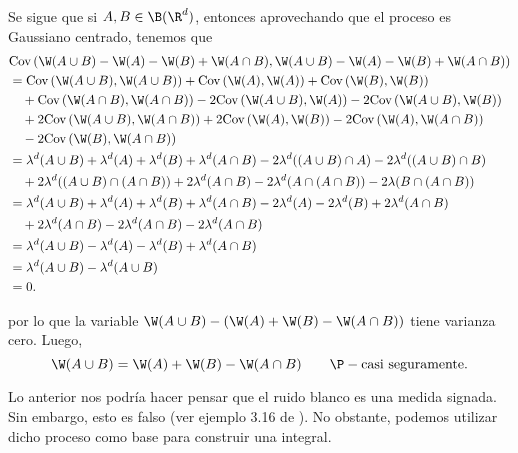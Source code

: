 \begin{ejem}
Se sigue que si $A,B\in \B(\R^d)$, entonces aprovechando que el proceso es Gaussiano centrado, tenemos que
\begin{align*}
    &\text{Cov}\left(\W(A\cup B)-\W(A)-\W(B)+\W(A\cap B),\W(A\cup B)-\W(A)-\W(B)+\W(A\cap B)\right)\\
    &=\text{Cov}\left(\W(A\cup B),\W(A\cup B)\right)+\text{Cov}\left(\W(A),\W(A)\right)+\text{Cov}\left(\W(B),\W(B)\right)\\
    &\quad +\text{Cov}\left(\W(A\cap B),\W(A\cap B)\right)-2 \text{Cov}\left(\W(A\cup B),\W(A)\right)-2 \text{Cov}\left(\W(A\cup B), \W(B)\right)\\
    &\quad +2 \text{Cov}\left(\W(A\cup B), \W(A\cap B)\right)+2 \text{Cov}\left(\W(A),\W(B)\right)-2 \text{Cov}\left(\W(A),\W(A\cap B)\right)\\
    &\quad -2 \text{Cov}\left(\W(B),\W(A\cap B)\right)\\
    &=\lambda^{d}(A\cup B)+\lambda^{d}(A)+\lambda^{d}(B)+\lambda^{d}(A\cap B)-2\lambda^{d}((A\cup B)\cap A)-2\lambda^{d}((A\cup B)\cap B)\\
    &\quad+2\lambda^{d}((A\cup B)\cap (A\cap B))+2\lambda^{d}(A\cap B)-2\lambda^{d}(A\cap (A\cap B))-2\lambda(B\cap(A\cap B))\\
    &=\lambda^{d}(A\cup B)+\lambda^d(A)+\lambda^{d}(B)+\lambda^{d}(A\cap B)-2\lambda^{d}(A)-2\lambda^{d}(B)+2\lambda^{d}(A\cap B)\\
    &\quad +2\lambda^{d}(A\cap B)-2\lambda^{d}(A\cap B)-2\lambda^{d}(A\cap B)\\
    &=\lambda^{d}(A\cup B)-\lambda^d(A)-\lambda^{d}(B)+\lambda^{d}(A\cap B)\\
    &=\lambda^{d}(A\cup B)-\lambda^{d}(A\cup B)\\
    &=0.
\end{align*}

por lo que la variable $\W(A\cup B)-(\W(A)+\W(B)-\W(A\cap B))$ tiene varianza cero. Luego,
\begin{equation}\label{Wdotmeasure}    
    \W(A\cup B)=\W(A)+\W(B)-\W(A\cap B) \qquad \P-\text{casi seguramente}.
\end{equation}


\end{ejem}
Lo anterior nos podría hacer pensar que el ruido blanco es una medida signada. Sin embargo, esto es falso (ver ejemplo 3.16 de \cite{Khoshnevisan2009}). No obstante, podemos utilizar dicho proceso como base para construir una integral.

